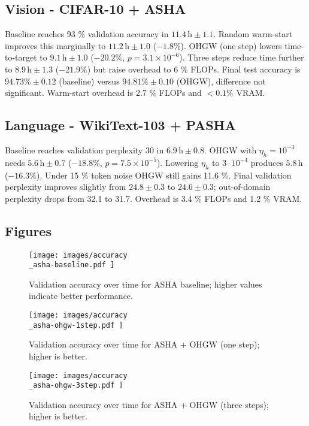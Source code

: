 \documentclass{article}
\begin{document}
\subsection{Vision - CIFAR-10 + ASHA}
Baseline reaches 93 \% validation accuracy in \(11.4\,\mathrm{h} \pm 1.1\). Random warm-start improves this marginally to \(11.2\,\mathrm{h} \pm 1.0\) (\(-1.8 \%\)). OHGW (one step) lowers time-to-target to \(9.1\,\mathrm{h} \pm 1.0\) (\(-20.2 \%\), \(p = 3.1 \times 10^{-6}\)). Three steps reduce time further to \(8.9\,\mathrm{h} \pm 1.3\) (\(-21.9 \%\)) but raise overhead to 6 \% FLOPs. Final test accuracy is \(94.73 \% \pm 0.12\) (baseline) versus \(94.81 \% \pm 0.10\) (OHGW), difference not significant. Warm-start overhead is 2.7 \% FLOPs and \(<0.1 \%\) VRAM.

\subsection{Language - WikiText-103 + PASHA}
Baseline reaches validation perplexity 30 in \(6.9\,\mathrm{h} \pm 0.8\). OHGW with \(\eta_h = 10^{-3}\) needs \(5.6\,\mathrm{h} \pm 0.7\) (\(-18.8 \%\), \(p = 7.5 \times 10^{-5}\)). Lowering \(\eta_h\) to \(3\cdot 10^{-4}\) produces \(5.8\,\mathrm{h}\) (\(-16.3 \%\)). Under 15 \% token noise OHGW still gains 11.6 \%. Final validation perplexity improves slightly from \(24.8 \pm 0.3\) to \(24.6 \pm 0.3\); out-of-domain perplexity drops from 32.1 to 31.7. Overhead is 3.4 \% FLOPs and 1.2 \% VRAM.

\subsection{Figures}
\begin{figure}[H]
\centering
\texttt{[image:  images/accuracy\\\_asha-baseline.pdf ]}
\caption{Validation accuracy over time for ASHA baseline; higher values indicate better performance.}
\end{figure}

\begin{figure}[H]
\centering
\texttt{[image:  images/accuracy\\\_asha-ohgw-1step.pdf ]}
\caption{Validation accuracy over time for ASHA + OHGW (one step); higher is better.}
\end{figure}

\begin{figure}[H]
\centering
\texttt{[image:  images/accuracy\\\_asha-ohgw-3step.pdf ]}
\caption{Validation accuracy over time for ASHA + OHGW (three steps); higher is better.}
\end{figure}
\end{document}
